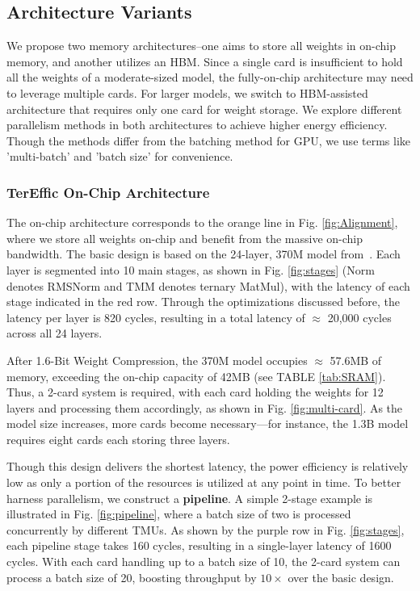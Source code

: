 \subsection{Architecture Variants}
We propose two memory architectures--one aims to store all weights in on-chip memory, and another utilizes an HBM. Since a single card is insufficient to hold all the weights of a moderate-sized model, the fully-on-chip architecture may need to leverage multiple cards. For larger models, we switch to HBM-assisted architecture that requires only one card for weight storage. We explore different parallelism methods in both architectures to achieve higher energy efficiency. Though the methods differ from the batching method for GPU, we use terms like 'multi-batch' and 'batch size' for convenience.
\subsubsection{TerEffic On-Chip Architecture}
\label{sec:On-Chip Architecture}
The on-chip architecture corresponds to the orange line in Fig. \ref{fig:Alignment}, where we store all weights on-chip and benefit from the massive on-chip bandwidth.
The basic design is based on the 24-layer, 370M model from~\cite{scalable}. Each layer is segmented into 10 main stages, as shown in Fig. \ref{fig:stages} (Norm denotes RMSNorm and TMM denotes ternary MatMul), with the latency of each stage indicated in the red row. Through the optimizations discussed before, the latency per layer is 820 cycles, resulting in a total latency of $\approx$  20,000 cycles across all 24 layers.

After 1.6-Bit Weight Compression, the 370M model occupies $\approx$ 57.6MB of memory, exceeding the on-chip capacity of 42MB (see TABLE \ref{tab:SRAM}). Thus, a 2-card system is required, with each card holding the weights for 12 layers and processing them accordingly, as shown in Fig. \ref{fig:multi-card}. As the model size increases, more cards become necessary—for instance, the 1.3B model requires eight cards each storing three layers.

Though this design delivers the shortest latency, the power efficiency is relatively low as only a portion of the resources is utilized at any point in time. To better harness parallelism, we construct a \textbf{pipeline}. A simple 2-stage example is illustrated in Fig. \ref{fig:pipeline}, where a batch size of two is processed concurrently by different TMUs.
As shown by the purple row in Fig. \ref{fig:stages}, each pipeline stage takes 160 cycles, resulting in a single-layer latency of 1600 cycles. With each card handling up to a batch size of 10, the 2-card system can process a batch size of 20, boosting throughput by $10\times$ over the basic design.

